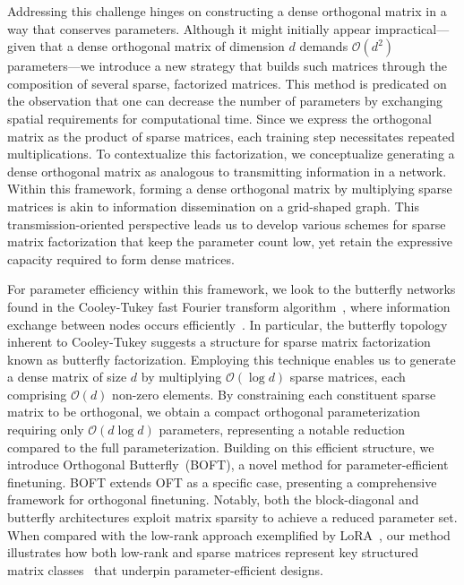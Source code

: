 Addressing this challenge hinges on constructing a dense orthogonal matrix in a way that conserves parameters. Although it might initially appear impractical—given that a dense orthogonal matrix of dimension $d$ demands $\mathcal{O}(d^2)$ parameters—we introduce a new strategy that builds such matrices through the composition of several sparse, factorized matrices. This method is predicated on the observation that one can decrease the number of parameters by exchanging spatial requirements for computational time. Since we express the orthogonal matrix as the product of sparse matrices, each training step necessitates repeated multiplications. To contextualize this factorization, we conceptualize generating a dense orthogonal matrix as analogous to transmitting information in a network. Within this framework, forming a dense orthogonal matrix by multiplying sparse matrices is akin to information dissemination on a grid-shaped graph. This transmission-oriented perspective leads us to develop various schemes for sparse matrix factorization that keep the parameter count low, yet retain the expressive capacity required to form dense matrices.

For parameter efficiency within this framework, we look to the butterfly networks found in the Cooley-Tukey fast Fourier transform algorithm~\cite{cooley1965algorithm}, where information exchange between nodes occurs efficiently~\cite{klasing1994broadcasting}. In particular, the butterfly topology inherent to Cooley-Tukey suggests a structure for sparse matrix factorization known as butterfly factorization. Employing this technique enables us to generate a dense matrix of size $d$ by multiplying $\mathcal{O}(\log d)$ sparse matrices, each comprising $\mathcal{O}(d)$ non-zero elements. By constraining each constituent sparse matrix to be orthogonal, we obtain a compact orthogonal parameterization requiring only $\mathcal{O}(d\log d)$ parameters, representing a notable reduction compared to the full parameterization. Building on this efficient structure, we introduce Orthogonal Butterfly~(BOFT), a novel method for parameter-efficient finetuning. BOFT extends OFT as a specific case, presenting a comprehensive framework for orthogonal finetuning. Notably, both the block-diagonal and butterfly architectures exploit matrix sparsity to achieve a reduced parameter set. When compared with the low-rank approach exemplified by LoRA~\cite{hulora2022}, our method illustrates how both low-rank and sparse matrices represent key structured matrix classes~\cite{candes2011robust} that underpin parameter-efficient designs.

